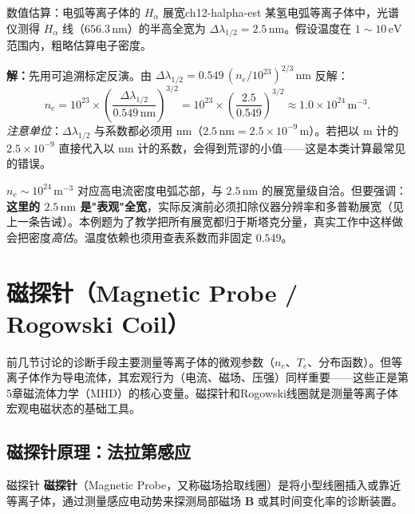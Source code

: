 \documentclass[12pt,a4paper,openany,oneside]{book}
\newcommand{\vect}[1]{\bm{#1}}
\newcommand{\difficulty}[1]{\marginnote{\hfill\textcolor{coverMid!80}{\rule[-0.1em]{2pt}{0.9em}}\,\textcolor{coverMid}{\footnotesize\textbf{[#1]}}}}
\begin{document}
\begin{example}{数值估算：电弧等离子体的 $H_\alpha$ 展宽}{ch12-halpha-est}
\difficulty{基础}
某氢电弧等离子体中，光谱仪测得 $H_\alpha$ 线（$656.3\,\mathrm{nm}$）的半高全宽为 $\Delta\lambda_{1/2} = 2.5\,\mathrm{nm}$。假设温度在 $1\sim 10\,\mathrm{eV}$ 范围内，粗略估算电子密度。

\textbf{解：}先用可追溯标定反演。由 $\Delta\lambda_{1/2} = 0.549\,(n_e/10^{23})^{2/3}\,\mathrm{nm}$ 反解：
\begin{equation}
n_e = 10^{23}\times\left(\frac{\Delta\lambda_{1/2}}{0.549\,\mathrm{nm}}\right)^{3/2}
= 10^{23}\times\left(\frac{2.5}{0.549}\right)^{3/2}
\approx 1.0\times 10^{24}\,\mathrm{m}^{-3}.
\end{equation}
\emph{注意单位}：$\Delta\lambda_{1/2}$ 与系数都必须用 $\mathrm{nm}$（$2.5\,\mathrm{nm} = 2.5\times10^{-9}\,\mathrm{m}$）。若把以 $\mathrm{m}$ 计的 $2.5\times10^{-9}$ 直接代入以 $\mathrm{nm}$ 计的系数，会得到荒谬的小值——这是本类计算最常见的错误。

$n_e\sim10^{24}\,\mathrm{m}^{-3}$ 对应高电流密度电弧芯部，与 $2.5\,\mathrm{nm}$ 的展宽量级自洽。但要强调：\textbf{这里的 $2.5\,\mathrm{nm}$ 是"表观"全宽}，实际反演前必须扣除仪器分辨率和多普勒展宽（见上一条告诫）。本例题为了教学把所有展宽都归于斯塔克分量，真实工作中这样做会把密度\emph{高估}。温度依赖也须用查表系数而非固定 $0.549$。
\end{example}


\section{磁探针（Magnetic Probe / Rogowski Coil）}
\label{sec:12.6}

前几节讨论的诊断手段主要测量等离子体的微观参数（$n_e$、$T_e$、分布函数）。但等离子体作为导电流体，其宏观行为（电流、磁场、压强）同样重要——这些正是第5章磁流体力学（MHD）的核心变量。磁探针和Rogowski线圈就是测量等离子体宏观电磁状态的基础工具。

\subsection{磁探针原理：法拉第感应}

\begin{definition}{磁探针}{}{}
\textbf{磁探针}（Magnetic Probe，又称磁场拾取线圈）是将小型线圈插入或靠近等离子体，通过测量感应电动势来探测局部磁场 $\vect{B}$ 或其时间变化率的诊断装置。
\end{definition}
\end{document}
